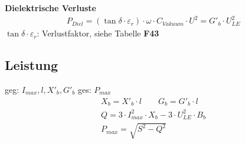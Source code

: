 \textbf{Dielektrische Verluste}
\begin{gather*}
    P_{Diel} = (\tan \delta \cdot \varepsilon_{r}) \cdot \omega \cdot C_{\mathit{Vakuum}} \cdot U^2 = G'_b\cdot U^2_{LE}
\end{gather*}
\indent $\tan \delta \cdot \varepsilon_{r}$: Verlustfaktor, siehe Tabelle \textbf{F43}


\subsection{Leistung}
geg: $I_{max} , l , X'_b, G'_b$ \qquad ges: $P_{max}$
\begin{gather*}
    X_b = X'_b \cdot l \qquad G_b = G'_b \cdot l \\
    Q = 3 \cdot I^2_{max} \cdot X_b - 3 \cdot U^2_{LE} \cdot B_b\\
    P_{max} = \sqrt{S^2-Q^2}
\end{gather*}
